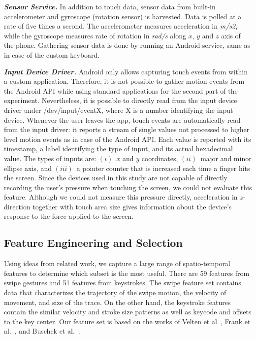 \documentclass{llncs}
\begin{document}
\medskip \noindent \textbf{\emph{Sensor Service.}}
In addition to touch data, sensor data from built-in accelerometer and gyroscope (rotation sensor) is harvested. Data is polled at a rate of five times a second. The accelerometer measures acceleration in \textit{m/s2}, while the gyroscope measures rate of rotation in \textit{rad/s} along $x$, $y$ and $z$ axis of the phone. Gathering sensor data is done by running an Android service, same as in case of the custom keyboard.

\medskip \noindent \textbf{\emph{Input Device Driver.}}
Android only allows capturing touch events from within a custom application. Therefore, it is not possible to gather motion events from the Android API while using standard applications for the second part of the experiment. Nevertheless, it is possible to directly read from the input device driver under /dev/input/eventX, where X is a number identifying the input device. Whenever the user leaves the app, touch events are automatically read from the input driver: it reports a stream of single values not processed to higher level motion events as in case of the Android API. Each value is reported with its timestamp, a label identifying the type of input, and its actual hexadecimal value. The types of inputs are: $(i)$~$x$ and $y$ coordinates, $(ii)$~major and minor ellipse axis, and $(iii)$~a pointer counter that is increased each time a finger hits the screen. Since the devices used in this study are not capable of directly recording the user's pressure when touching the screen, we could not evaluate this feature. Although we could not measure this pressure directly, acceleration in $z$-direction together with touch area size gives information about the device's response to the force applied to the screen.

\subsection{Feature Engineering and Selection}

Using ideas from related work, we capture a large range of spatio-temporal features to determine which subset is the most useful. There are 59 features from swipe gestures and 51 features from keystrokes. The swipe feature set contains data that characterizes the trajectory of the swipe motion, the velocity of movement, and size of the trace. On the other hand, the keystroke features contain the similar velocity and stroke size patterns as well as keycode and offsets to the key center. Our feature set is based on the works of Velten et al~\cite{velten2015user}, Frank et al.~\cite{Frank13}, and Buschek et al.~\cite{buschek2015}.
\end{document}
